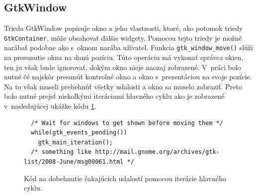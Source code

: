 \documentclass[12pt,oneside,final]{fithesis2}
\begin{document}
\subsection{GtkWindow}
Trieda GtkWindow popisuje okno a jeho vlastnosti, ktoré, ako potomok triedy \texttt{GtkContainer}, môže obsahovať ďalšie widgety. Pomocou tejto triedy je možné narábať podobne ako s~oknom narába užívateľ. Funkcia \texttt{gtk\_\-window\_\-move()} slúži na presunutie okna na danú pozíciu. Túto operáciu má vykonať správca okien, ten ju však bude ignorovať, dokým okno nieje naozaj zobrazené. V~práci bolo nutné čé najskôr presunúť kontrolné okno a okno s~prezentáciou na svoje pozície. Na to však museli prebehnúť všetky udalosti a okno sa muselo zobraziť. Preto bolo nutné prejsť niekoľkými iteráciami hlavného cyklu ako je zobrazené v~nasledujúcej ukážke kódu \ref{iterate}.
\begin{figure}[hbtp]
\begin{tiny}
\begin{verbatim}
  /* Wait for windows to get shown before moving them */
  while(gtk_events_pending())
    gtk_main_iteration();
  /* something like http://mail.gnome.org/archives/gtk-list/2008-June/msg00061.html */
\end{verbatim}
\end{tiny}
\caption{Kód na dobehnutie čakajúcich udalostí pomocou iterácie hlavného cyklu.}
\label{iterate}
\end{figure}
\end{document}
